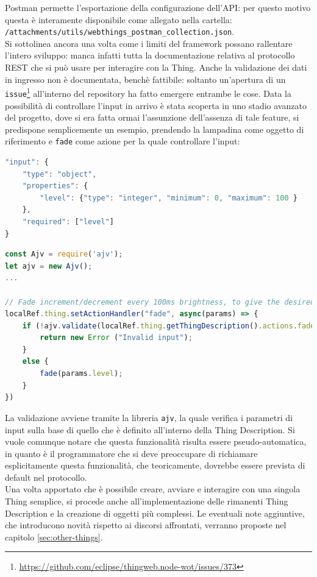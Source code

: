\documentclass[12pt,a4paper,openright,oneside]{report}
\begin{document}
Postman permette l'esportazione della configurazione dell'API: per questo motivo questa è interamente disponibile come allegato nella cartella:\\ \texttt{/attachments/utils/webthings\_postman\_collection.json}.\\

Si sottolinea ancora una volta come i limiti del framework possano rallentare l'intero sviluppo: manca infatti tutta la documentazione relativa al protocollo REST che si può usare per interagire con la Thing. Anche la validazione dei dati in ingresso non è documentata, benchè fattibile: soltanto un'apertura di un \texttt{issue}\footnote{\url{https://github.com/eclipse/thingweb.node-wot/issues/373}} all'interno del repository ha fatto emergere entrambe le cose. Data la possibilità di controllare l'input in arrivo è stata scoperta in uno stadio avanzato del progetto, dove si era fatta ormai l'assunzione dell'assenza di tale feature, si predispone semplicemente un esempio, prendendo la lampadina come oggetto di riferimento e \texttt{fade} come azione per la quale controllare l'input:

\begin{lstlisting}[language=JavaScript]
"input": {
	"type": "object",
	"properties": {
		"level": {"type": "integer", "minimum": 0, "maximum": 100 }
	},
	"required": ["level"]
}
\end{lstlisting}

\begin{lstlisting}[language=JavaScript]
const Ajv = require('ajv');
let ajv = new Ajv();
...

// Fade increment/decrement every 100ms brightness, to give the desired value
localRef.thing.setActionHandler("fade", async(params) => {
	if (!ajv.validate(localRef.thing.getThingDescription().actions.fade.input, params)) {
		return new Error ("Invalid input");
	}
	else {
		fade(params.level);
	}
})
\end{lstlisting}

La validazione avviene tramite la libreria \texttt{ajv}, la quale verifica i parametri di input sulla base di quello che è definito all'interno della Thing Description. Si vuole comunque notare che questa funzionalità risulta essere pseudo-automatica, in quanto è il programmatore che si deve preoccupare di richiamare esplicitamente questa funzionalità, che teoricamente, dovrebbe essere prevista di default nel protocollo.\\

Una volta apportato che è possibile creare, avviare e interagire con una singola Thing semplice, si procede anche all'implementazione delle rimanenti Thing Description e la creazione di oggetti più complessi. Le eventuali note aggiuntive, che introducono novità rispetto ai discorsi affrontati, verranno proposte nel capitolo \ref{sec:other-things}.
\end{document}
